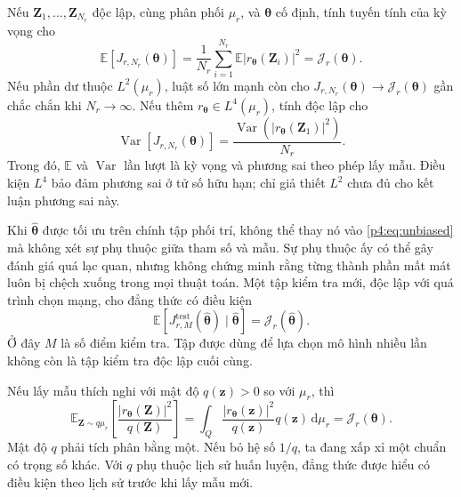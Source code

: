Nếu $\mathbf{Z}_1,\ldots,\mathbf{Z}_{N_r}$ độc lập, cùng phân phối
$\mu_r$, và $\boldsymbol{\theta}$ cố định, tính tuyến tính của kỳ vọng cho
\begin{equation}
 \mathbb{E}[J_{r,N_r}(\boldsymbol{\theta})]
 =\frac{1}{N_r}\sum_{i=1}^{N_r}
       \mathbb{E}|r_{\boldsymbol{\theta}}(\mathbf{Z}_i)|^2
 =\mathcal{J}_r(\boldsymbol{\theta}).
 \label{p4:eq:unbiased}
\end{equation}
Nếu phần dư thuộc $L^2(\mu_r)$, luật số lớn mạnh còn cho
$J_{r,N_r}(\boldsymbol{\theta})\to\mathcal{J}_r(\boldsymbol{\theta})$
gần chắc chắn khi $N_r\to\infty$. Nếu thêm
$r_{\boldsymbol{\theta}}\in L^4(\mu_r)$, tính độc lập cho
\begin{equation}
 \operatorname{Var}[J_{r,N_r}(\boldsymbol{\theta})]
 =\frac{\operatorname{Var}(|r_{\boldsymbol{\theta}}(\mathbf{Z}_1)|^2)}{N_r}.
 \label{p4:eq:mc-variance}
\end{equation}
Trong đó, $\mathbb{E}$ và $\operatorname{Var}$ lần lượt là kỳ vọng và
phương sai theo phép lấy mẫu. Điều kiện $L^4$ bảo đảm phương sai ở tử
số hữu hạn; chỉ giả thiết $L^2$ chưa đủ cho kết luận phương sai này.

Khi $\widehat{\boldsymbol{\theta}}$ được tối ưu trên chính tập phối trí,
không thể thay nó vào \eqref{p4:eq:unbiased} mà không xét sự phụ thuộc
giữa tham số và mẫu. Sự phụ thuộc ấy có thể gây đánh giá quá lạc quan,
nhưng không chứng minh rằng từng thành phần mất mát luôn bị chệch
xuống trong mọi thuật toán. Một tập kiểm tra mới, độc lập với quá trình
chọn mạng, cho đẳng thức có điều kiện
\begin{equation}
 \mathbb{E}\!\left[J^{\mathrm{test}}_{r,M}
  (\widehat{\boldsymbol{\theta}})\mid\widehat{\boldsymbol{\theta}}\right]
 =\mathcal{J}_r(\widehat{\boldsymbol{\theta}}).
 \label{p4:eq:test-unbiased}
\end{equation}
Ở đây $M$ là số điểm kiểm tra. Tập được dùng để lựa chọn mô hình nhiều
lần không còn là tập kiểm tra độc lập cuối cùng.

Nếu lấy mẫu thích nghi với mật độ $q(\mathbf{z})>0$ so với
$\mu_r$, thì
\begin{equation}
 \mathbb{E}_{\mathbf{Z}\sim q\mu_r}
 \left[\frac{|r_{\boldsymbol{\theta}}(\mathbf{Z})|^2}{q(\mathbf{Z})}\right]
 =\int_Q\frac{|r_{\boldsymbol{\theta}}(\mathbf{z})|^2}{q(\mathbf{z})}
              q(\mathbf{z})\,\mathrm{d}\mu_r
 =\mathcal{J}_r(\boldsymbol{\theta}).
 \label{p4:eq:importance}
\end{equation}
Mật độ $q$ phải tích phân bằng một. Nếu bỏ hệ số $1/q$, ta đang xấp
xỉ một chuẩn có trọng số khác. Với $q$ phụ thuộc lịch sử huấn luyện,
đẳng thức được hiểu có điều kiện theo lịch sử trước khi lấy mẫu mới.

